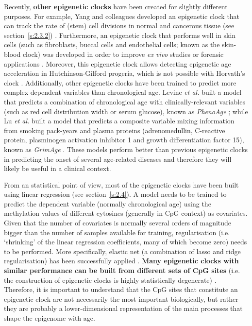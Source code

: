 Recently, \textbf{other epigenetic clocks} have been created for slightly different purposes. For example, Yang and colleagues developed an epigenetic clock that can track the rate of (stem) cell divisions in normal and cancerous tissue (see section~\ref{s:2.3.2}) \cite{Yang2016}. Furthermore, an epigenetic clock that performs well in skin cells (such as fibroblasts, buccal cells and endothelial cells; known as the skin-blood clock) was developed in order to improve \textit{ex vivo} studies or forensic applications \cite{Horvath2018a}. Moreover, this epigenetic clock allows detecting epigenetic age acceleration in Hutchinson-Gilford progeria, which is not possible with Horvath's clock \cite{Horvath2018a}. Additionally, other epigenetic clocks have been trained to predict more complex dependent variables than chronological age. Levine \textit{et al.} built a model that predicts a combination of chronological age with clinically-relevant variables (such as red cell distribution width or serum glucose), known as \textit{PhenoAge} \cite{Levine2018}; while Lu \textit{et al.} built a model that predicts a composite variable mixing information from smoking pack-years and plasma proteins (adrenomedullin, C-reactive protein, plasminogen activation inhibitor 1 and growth differentiation factor 15), known as \textit{GrimAge} \cite{Lu2019}. These models perform better than previous epigenetic clocks in predicting the onset of several age-related diseases and therefore they will likely be useful in a clinical context.    

\bigskip

From an statistical point of view, most of the epigenetic clocks have been built using linear regression (see section~\ref{s:2.4}). A model needs to be trained to predict the dependent variable (normally chronological age) using the methylation values of different cytosines (generally in CpG context) as covariates. Given that the number of covariates is normally several orders of magnitude bigger than the number of samples available for training, regularisation (i.e. `shrinking' of the linear regression coefficients, many of which become zero) needs to be performed. More specifically, elastic net (a combination of lasso and ridge regularisation) has been successfully applied \cite{Friedman2010}. \textbf{Many epigenetic clocks with similar performance can be built from different sets of CpG sites} (i.e. the construction of epigenetic clocks is highly statistically degenerate) \cite{Thompson2018}. Therefore, it is important to understand that the CpG sites that constitute an epigenetic clock are not necessarily the most important biologically, but rather they are probably a lower-dimensional representation of the main processes that shape the epigenome with age.



